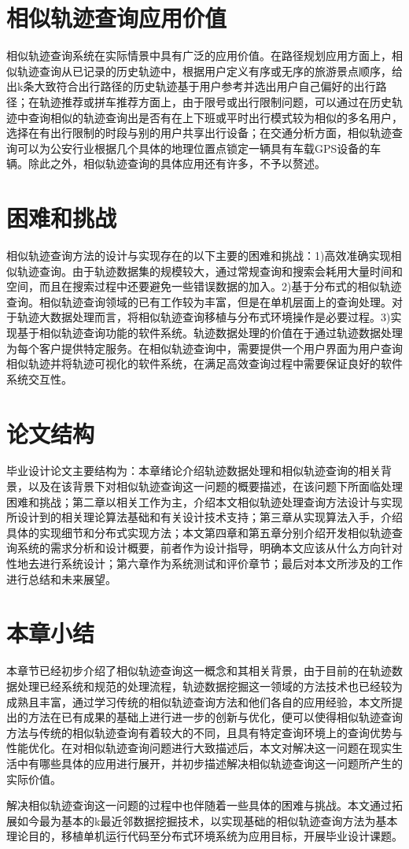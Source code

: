 \section{相似轨迹查询应用价值}
\label{sec:application value}
相似轨迹查询系统在实际情景中具有广泛的应用价值。在路径规划应用方面上，相似轨迹查询从已记录的历史轨迹中，根据用户定义有序或无序的旅游景点顺序，给出k条大致符合出行路径的历史轨迹基于用户参考并选出用户自己偏好的出行路径；在轨迹推荐或拼车推荐方面上，由于限号或出行限制问题，可以通过在历史轨迹中查询相似的轨迹查询出是否有在上下班或平时出行模式较为相似的多名用户，选择在有出行限制的时段与别的用户共享出行设备；在交通分析方面，相似轨迹查询可以为公安行业根据几个具体的地理位置点锁定一辆具有车载GPS设备的车辆。除此之外，相似轨迹查询的具体应用还有许多，不予以赘述。

\section{困难和挑战}
\label{sec:difficulty}
相似轨迹查询方法的设计与实现存在的以下主要的困难和挑战：1)高效准确实现相似轨迹查询。由于轨迹数据集的规模较大，通过常规查询和搜索会耗用大量时间和空间，而且在搜索过程中还要避免一些错误数据的加入。2)基于分布式的相似轨迹查询。相似轨迹查询领域的已有工作较为丰富，但是在单机层面上的查询处理。对于轨迹大数据处理而言，将相似轨迹查询移植与分布式环境操作是必要过程。3)实现基于相似轨迹查询功能的软件系统。轨迹数据处理的价值在于通过轨迹数据处理为每个客户提供特定服务。在相似轨迹查询中，需要提供一个用户界面为用户查询相似轨迹并将轨迹可视化的软件系统，在满足高效查询过程中需要保证良好的软件系统交互性。

\section{论文结构}
\label{sec:requirements}
毕业设计论文主要结构为：本章绪论介绍轨迹数据处理和相似轨迹查询的相关背景，以及在该背景下对相似轨迹查询这一问题的概要描述，在该问题下所面临处理困难和挑战；第二章以相关工作为主，介绍本文相似轨迹处理查询方法设计与实现所设计到的相关理论算法基础和有关设计技术支持；第三章从实现算法入手，介绍具体的实现细节和分布式实现方法；本文第四章和第五章分别介绍开发相似轨迹查询系统的需求分析和设计概要，前者作为设计指导，明确本文应该从什么方向针对性地去进行系统设计；第六章作为系统测试和评价章节；最后对本文所涉及的工作进行总结和未来展望。

\section{本章小结}
\label{sec:requirements}
本章节已经初步介绍了相似轨迹查询这一概念和其相关背景，由于目前的在轨迹数据处理已经系统和规范的处理流程，轨迹数据挖掘这一领域的方法技术也已经较为成熟且丰富，通过学习传统的相似轨迹查询方法和他们各自的应用经验，本文所提出的方法在已有成果的基础上进行进一步的创新与优化，便可以使得相似轨迹查询方法与传统的相似轨迹查询有着较大的不同，且具有特定查询环境上的查询优势与性能优化。在对相似轨迹查询问题进行大致描述后，本文对解决这一问题在现实生活中有哪些具体的应用进行展开，并初步描述解决相似轨迹查询这一问题所产生的实际价值。

解决相似轨迹查询这一问题的过程中也伴随着一些具体的困难与挑战。本文通过拓展如今最为基本的k最近邻数据挖掘技术，以实现基础的相似轨迹查询方法为基本理论目的，移植单机运行代码至分布式环境系统为应用目标，开展毕业设计课题。


